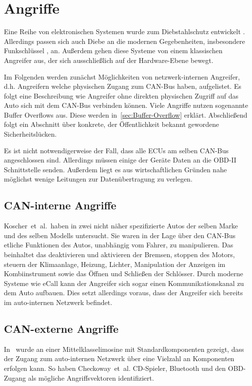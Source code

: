 \section{Angriffe}\label{ch:attack}

Eine Reihe von elektronischen Systemen wurde zum Diebstahlschutz entwickelt
\cite{Song2008,Turner1999,Hwang1997}. Allerdings passen sich auch Diebe an die
modernen Gegebenheiten, insbesondere Funkschlüssel \cite{Lee2014}, an. Außerdem
gehen diese Systeme von einem klassischen Angreifer aus, der sich
ausschließlich auf der Hardware-Ebene bewegt.

Im Folgenden werden zunächst Möglichkeiten von netzwerk-internen Angreifer,
d.h. Angreifern welche physischen Zugang zum CAN-Bus haben, aufgelistet. Es
folgt eine Beschreibung wie Angreifer ohne direkten physischen Zugriff auf das
Auto sich mit dem CAN-Bus verbinden können. Viele Angriffe nutzen sogenannte
Buffer Overflows aus. Diese werden in~\cref{sec:Buffer-Overflow} erklärt.
Abschließend folgt ein Abschnitt über konkrete, der Öffentlichkeit bekannt
gewordene Sicherheitslücken.

Es ist nicht notwendigerweise der Fall, dass alle ECUs am selben CAN-Bus
angeschlossen sind. Allerdings müssen einige der Geräte Daten an die OBD-II
Schnittstelle senden. Außerdem liegt es aus wirtschaftlichen Gründen nahe
möglichst wenige Leitungen zur Datenübertragung zu verlegen.


\subsection{CAN-interne Angriffe}
Koscher~et~al.~haben in \cite{Koscher2010} zwei nicht näher spezifizierte Autos
der selben Marke und des selben Modells untersucht. Sie waren in der Lage über
den CAN-Bus etliche Funktionen des Autos, unabhängig vom Fahrer, zu
manipulieren. Das beinhaltet das deaktivieren und aktivieren der Bremsen,
stoppen des Motors, steuern der Klimaanlage, Heizung, Lichter, Manipulation der
Anzeigen im Kombiinstrument sowie das Öffnen und Schließen der Schlösser. Durch
moderne Systeme wie eCall kann der Angreifer sich sogar einen
Kommunikationskanal zu dem Auto aufbauen. Dies setzt allerdings voraus, dass
der Angreifer sich bereits im auto-internen Netzwerk befindet.

\subsection{CAN-externe Angriffe}
In~\cite{Checkoway2011} wurde an einer Mittelklasselimosine mit
Standardkomponenten gezeigt, dass der Zugang zum auto-internen Netzwerk über
eine Vielzahl an Komponenten erfolgen kann. So haben Checkoway~et~al.
CD-Spieler, Bluetooth und den OBD-Zugang als mögliche Angriffsvektoren
identifiziert.

